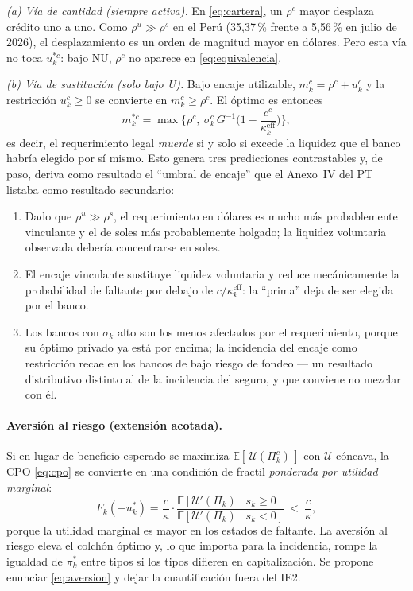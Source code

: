 \documentclass[11pt]{article}
\newcommand{\E}{\mathbb{E}}
\newcommand{\keff}{\kappa^{\mathrm{eff}}}
\theoremstyle{definition}
\begin{document}
\emph{(a) V\'ia de cantidad (siempre activa).} En \eqref{eq:cartera}, un $\rho^c$
mayor desplaza cr\'edito uno a uno. Como $\rho^u\gg\rho^s$ en el Per\'u
(35{,}37\,\% frente a 5{,}56\,\% en julio de 2026), el desplazamiento es un orden
de magnitud mayor en d\'olares. Pero esta v\'ia no toca $u^{*c}_k$: bajo NU,
$\rho^c$ no aparece en \eqref{eq:equivalencia}.

\emph{(b) V\'ia de sustituci\'on (solo bajo U).} Bajo encaje utilizable,
$m^c_k=\rho^c+u^c_k$ y la restricci\'on $u^c_k\ge0$ se convierte en
$m^c_k\ge\rho^c$. El \'optimo es entonces
\begin{equation}
m^{*c}_k=\max\Big\{\rho^c,\ \sigma^c_k\,G^{-1}\!\Big(1-\frac{c^c}{\keff_k}\Big)\Big\},
\label{eq:umbral}
\end{equation}
es decir, el requerimiento legal \emph{muerde} si y solo si excede la liquidez
que el banco habr\'ia elegido por s\'i mismo. Esto genera tres predicciones
contrastables y, de paso, deriva como resultado el ``umbral de encaje'' que el
Anexo~IV del PT listaba como resultado secundario:
\begin{enumerate}[leftmargin=*,itemsep=1pt]
\item Dado que $\rho^u\gg\rho^s$, el requerimiento en d\'olares es mucho m\'as
probablemente vinculante y el de soles m\'as probablemente holgado; la liquidez
voluntaria observada deber\'ia concentrarse en soles.
\item El encaje vinculante sustituye liquidez voluntaria y reduce
mec\'anicamente la probabilidad de faltante por debajo de $c/\keff_k$: la
``prima'' deja de ser elegida por el banco.
\item Los bancos con $\sigma_k$ alto son los menos afectados por el
requerimiento, porque su \'optimo privado ya est\'a por encima; la incidencia del
encaje como restricci\'on recae en los bancos de bajo riesgo de fondeo --- un
resultado distributivo distinto al de la incidencia del seguro, y que conviene
no mezclar con \'el.
\end{enumerate}

\paragraph{Aversi\'on al riesgo (extensi\'on acotada).} Si en lugar de beneficio
esperado se maximiza $\E[\,\mathcal{U}(\Pi^c_k)\,]$ con $\mathcal{U}$ c\'oncava, la
CPO \eqref{eq:cpo} se convierte en una condici\'on de fractil \emph{ponderada por
utilidad marginal}:
\begin{equation}
F_k(-u^*_k)=\frac{c}{\kappa}\cdot
\frac{\E[\mathcal{U}'(\Pi_k)\mid s_k\ge0]}{\E[\mathcal{U}'(\Pi_k)\mid s_k<0]}
\ <\ \frac{c}{\kappa},
\label{eq:aversion}
\end{equation}
porque la utilidad marginal es mayor en los estados de faltante. La aversi\'on al
riesgo eleva el colch\'on \'optimo y, lo que importa para la incidencia, rompe la
igualdad de $\pi^*_k$ entre tipos si los tipos difieren en capitalizaci\'on. Se
propone enunciar \eqref{eq:aversion} y dejar la cuantificaci\'on fuera del IE2.
\end{document}
